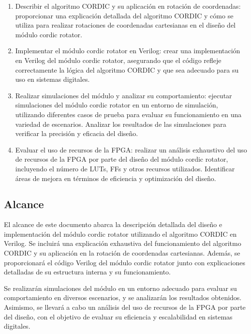 \documentclass[12pt,a4paper, twoside]{article} %
\begin{document}
\begin{enumerate}

\item Describir el algoritmo CORDIC y su aplicación en rotación de coordenadas: proporcionar una explicación detallada del algoritmo CORDIC y cómo se utiliza para realizar rotaciones de coordenadas cartesianas en el diseño del módulo cordic rotator.

\item Implementar el módulo cordic rotator en Verilog: crear una implementación en Verilog del módulo cordic rotator, asegurando que el código refleje correctamente la lógica del algoritmo CORDIC y que sea adecuado para su uso en sistemas digitales.

\item Realizar simulaciones del módulo y analizar su comportamiento: ejecutar simulaciones del módulo cordic rotator en un entorno de simulación, utilizando diferentes casos de prueba para evaluar su funcionamiento en una variedad de escenarios. Analizar los resultados de las simulaciones para verificar la precisión y eficacia del diseño.

\item Evaluar el uso de recursos de la FPGA: realizar un análisis exhaustivo del uso de recursos de la FPGA por parte del diseño del módulo cordic rotator, incluyendo el número de LUTs, FFs y otros recursos utilizados. Identificar áreas de mejora en términos de eficiencia y optimización del diseño.

\end{enumerate}


\subsection{Alcance}
\label{subsec:org12e44a2}

El alcance de este documento abarca la descripción detallada del diseño e implementación del módulo cordic rotator utilizando el algoritmo CORDIC en Verilog. Se incluirá una explicación exhaustiva del funcionamiento del algoritmo CORDIC y su aplicación en la rotación de coordenadas cartesianas. Además, se proporcionará el código Verilog del módulo cordic rotator junto con explicaciones detalladas de su estructura interna y su funcionamiento.

 Se realizarán simulaciones del módulo en un entorno adecuado para evaluar su comportamiento en diversos escenarios, y se analizarán los resultados obtenidos. Asimismo, se llevará a cabo un análisis del uso de recursos de la FPGA por parte del diseño, con el objetivo de evaluar su eficiencia y escalabilidad en sistemas digitales.
\end{document}
